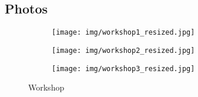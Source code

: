 \vfill
\subsection*{Photos}
\begin{figure}[hb]
\centering
    \begin{subfigure}{.32\textwidth}
        \centering
        \texttt{[image: img/workshop1\_resized.jpg]}
        \label{fig:workshop1}
    \end{subfigure}
    \begin{subfigure}{.32\textwidth}
        \centering
        \texttt{[image: img/workshop2\_resized.jpg]}
        \label{fig:workshop2}
    \end{subfigure}
    \begin{subfigure}{.32\textwidth}
        \centering
        \texttt{[image: img/workshop3\_resized.jpg]}
        \label{fig:workshop3}
    \end{subfigure}
    \caption{Workshop}
\end{figure}
\vfill

